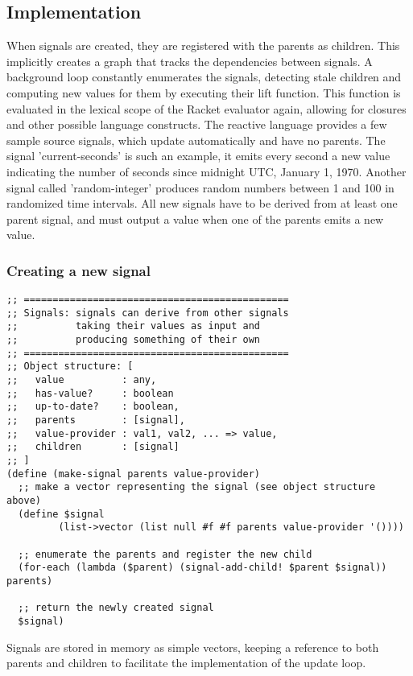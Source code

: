\newpage
\subsection{Implementation}

When signals are created, they are registered with the parents as children. This implicitly creates a graph that tracks the dependencies between signals. A background loop constantly enumerates the signals, detecting stale children and computing new values for them by executing their lift function. This function is evaluated in the lexical scope of the Racket evaluator again, allowing for closures and other possible language constructs. 
The reactive language provides a few sample source signals, which update automatically and have no parents. The signal 'current-seconds' is such an example, it emits every second a new value indicating the number of seconds since midnight UTC, January 1, 1970. Another signal called 'random-integer' produces random numbers between 1 and 100 in randomized time intervals. 
All new signals have to be derived from at least one parent signal, and must output a value when one of the parents emits a new value.

\subsubsection{Creating a new signal}
\begin{lstlisting}
;; ==============================================
;; Signals: signals can derive from other signals 
;;          taking their values as input and 
;;          producing something of their own
;; ==============================================
;; Object structure: [
;;   value          : any,         
;;   has-value?     : boolean
;;   up-to-date?    : boolean,
;;   parents        : [signal],
;;   value-provider : val1, val2, ... => value,
;;   children       : [signal]
;; ]
(define (make-signal parents value-provider)
  ;; make a vector representing the signal (see object structure above)
  (define $signal 
         (list->vector (list null #f #f parents value-provider '())))

  ;; enumerate the parents and register the new child
  (for-each (lambda ($parent) (signal-add-child! $parent $signal)) parents)

  ;; return the newly created signal
  $signal)
\end{lstlisting}
Signals are stored in memory as simple vectors, keeping a reference to both parents and children to facilitate the implementation of the update loop. 

